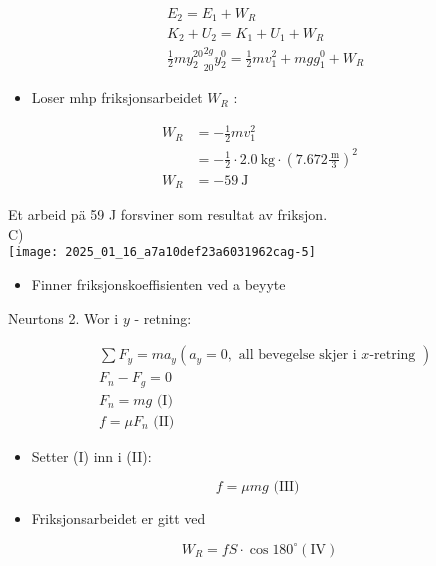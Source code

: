 \documentclass[10pt]{article}
\begin{document}
$$
\begin{aligned}
& E_{2}=E_{1}+W_{R} \\
& K_{2}+U_{2}=K_{1}+U_{1}+W_{R} \\
& \frac{1}{2} m{y_{2}^{20}}_{20}^{2 g} y_{2}^{0}=\frac{1}{2} m v_{1}^{2}+m g g_{1}^{0}+W_{R}
\end{aligned}
$$

\begin{itemize}
  \item Loser mhp friksjonsarbeidet $W_{R}$ :
\end{itemize}

$$
\begin{aligned}
W_{R} & =-\frac{1}{2} m v_{1}^{2} \\
& =-\frac{1}{2} \cdot 2.0 \mathrm{~kg} \cdot\left(7.672 \frac{\mathrm{~m}}{3}\right)^{2} \\
W_{R} & =-59 \mathrm{~J}
\end{aligned}
$$

Et arbeid pä 59 J forsviner som resultat av friksjon.\\
C)\\
\texttt{[image: 2025\_01\_16\_a7a10def23a6031962cag-5]}

\begin{itemize}
  \item Finner friksjonskoeffisienten ved a beyyte
\end{itemize}

Neurtons 2. Wor i $y$ - retning:

$$
\begin{aligned}
& \sum F_{y}=m a_{y}\left(a_{y}=0, \text { all bevegelse skjer i } x \text {-retring }\right) \\
& F_{n}-F_{g}=0 \\
& F_{n}=m g \text { (I) } \\
& f=\mu F_{n} \text { (II) }
\end{aligned}
$$

\begin{itemize}
  \item Setter (I) inn i (II):
\end{itemize}

$$
f=\mu m g \text { (III) }
$$

\begin{itemize}
  \item Friksjonsarbeidet er gitt ved
\end{itemize}

$$
W_{R}=f S \cdot \cos 180^{\circ}(\mathrm{IV})
$$
\end{document}
